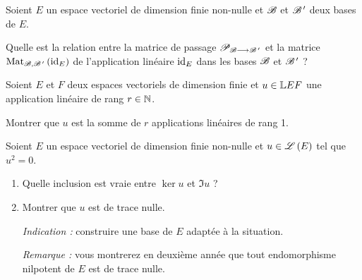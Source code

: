 \begin{corr}
\end{corr}

\begin{exo}
Soient \(E\) un espace vectoriel de dimension finie non-nulle et \(\mathscr{B}\) et \(\mathscr{B}^{\,\prime}\) deux bases de \(E\).

Quelle est la relation entre la matrice de passage \(\mathscr{P}_{\mathscr{B}\longrightarrow\mathscr{B}^{\,\prime}}\) et la matrice \(\Mat[\fami{B},\fami{B}\prim]{\id{E}}\) de l'application linéaire \(\mathrm{id}_{E}\) dans les bases \(\mathscr{B}\) et \(\mathscr{B}^{\,\prime}\) ?
\end{exo}

\begin{corr}
\end{corr}

\begin{exo}
Soient \(E\) et \(F\) deux espaces vectoriels de dimension finie et \(u\in\mathbb{L}{E}{F}\) une application linéaire de rang \(r\in\mathbb{N}\).

Montrer que \(u\) est la somme de \(r\) applications linéaires de rang 1.
\end{exo}

\begin{corr}
\end{corr}

\begin{exo}
Soient \(E\) un espace vectoriel de dimension finie non-nulle et \(u\in\mathscr{L}\left(E\right)\) tel que \(u^2=0\).

\begin{enumerate}
\item Quelle inclusion est vraie entre \(\ker u\) et \(\Im u\) ? \\

\item Montrer que \(u\) est de trace nulle.

\textit{Indication :} construire une base de \(E\) adaptée à la situation.

\textit{Remarque :} vous montrerez en deuxième année que tout endomorphisme nilpotent de \(E\) est de trace nulle.
\end{enumerate}
\end{exo}

\begin{corr}
\end{corr}

